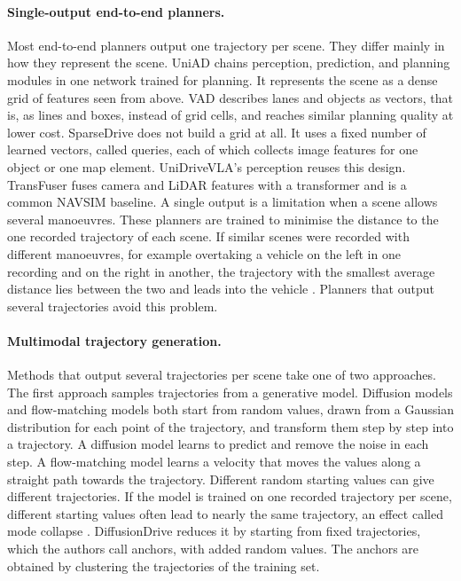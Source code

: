 \documentclass[11pt, a4paper, oneside]{book}
\begin{document}
\paragraph{Single-output end-to-end planners.}
Most end-to-end planners output one trajectory per scene. They differ mainly in how they
represent the scene. UniAD \cite{uniad} chains perception, prediction, and planning modules in
one network trained for planning. It represents the scene as a dense grid of features seen from
above. VAD \cite{vad} describes lanes and objects as vectors, that is, as lines and boxes,
instead of grid cells, and reaches similar planning quality at lower cost. SparseDrive
\cite{sparsedrive} does not build a grid at all. It uses a fixed number of learned vectors,
called queries, each of which collects image features for one object or one map element.
UniDriveVLA's perception reuses this design. TransFuser \cite{transfuser} fuses camera and LiDAR
features with a transformer and is a common NAVSIM baseline. A single output is a limitation when
a scene allows several manoeuvres. These planners are trained to minimise the distance to the one
recorded trajectory of each scene. If similar scenes were recorded with different manoeuvres, for
example overtaking a vehicle on the left in one recording and on the right in another, the
trajectory with the smallest average distance lies between the two and leads into the vehicle
\cite{multipath}. Planners that output several trajectories avoid this problem.

\paragraph{Multimodal trajectory generation.}
Methods that output several trajectories per scene take one of two approaches. The first
approach samples trajectories from a generative model. Diffusion models \cite{ddpm} and
flow-matching models \cite{flowmatching} both start from random values, drawn from a Gaussian
distribution for each point of the trajectory, and transform them step by step into a
trajectory. A diffusion model learns to predict and remove the noise in each step. A
flow-matching model learns a velocity that moves the values along a straight path towards the
trajectory. Different random starting values can give different trajectories. If the model is
trained on one recorded trajectory per scene, different starting values often lead to nearly
the same trajectory, an effect called mode collapse \cite{diffusiondrive}. DiffusionDrive
\cite{diffusiondrive} reduces it by starting from fixed trajectories, which the authors call
anchors, with added random values. The anchors are obtained by clustering the trajectories of the
training set.
\end{document}
